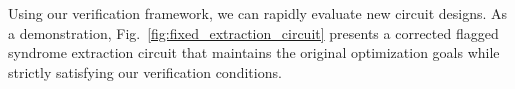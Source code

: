 \documentclass[acmsmall,screen,review,anonymous,nonacm]{acmart}
\begin{document}
Using our verification framework, we can rapidly evaluate new circuit designs. As a demonstration, Fig.~\ref{fig:fixed_extraction_circuit} presents a corrected flagged syndrome extraction circuit that maintains the original optimization goals while strictly satisfying our verification conditions.





\begin{figure}[h]
\centering

\begin{subfigure}{0.2\linewidth} 
\hspace*{-5.5cm}
\centering
{}
\end{subfigure}
\end{figure}
\end{document}
